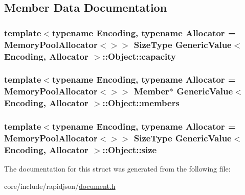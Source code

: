 \subsection{Member Data Documentation}
\subsubsection[{\texorpdfstring{capacity}{capacity}}]{\setlength{\rightskip}{0pt plus 5cm}template$<$typename Encoding, typename Allocator = Memory\+Pool\+Allocator$<$$>$$>$ {\bf Size\+Type} {\bf Generic\+Value}$<$ Encoding, Allocator $>$\+::Object\+::capacity}\hypertarget{structGenericValue_1_1Object_ab22a81c7ac57baf0d4ea343dfd6d8b33}{}\label{structGenericValue_1_1Object_ab22a81c7ac57baf0d4ea343dfd6d8b33}
\subsubsection[{\texorpdfstring{members}{members}}]{\setlength{\rightskip}{0pt plus 5cm}template$<$typename Encoding, typename Allocator = Memory\+Pool\+Allocator$<$$>$$>$ {\bf Member}$\ast$ {\bf Generic\+Value}$<$ Encoding, Allocator $>$\+::Object\+::members}\hypertarget{structGenericValue_1_1Object_ab51b8366577cb12f0280e4a6d7dab926}{}\label{structGenericValue_1_1Object_ab51b8366577cb12f0280e4a6d7dab926}
\subsubsection[{\texorpdfstring{size}{size}}]{\setlength{\rightskip}{0pt plus 5cm}template$<$typename Encoding, typename Allocator = Memory\+Pool\+Allocator$<$$>$$>$ {\bf Size\+Type} {\bf Generic\+Value}$<$ Encoding, Allocator $>$\+::Object\+::size}\hypertarget{structGenericValue_1_1Object_a10da3d9035961100ed11f955a4afd2b6}{}\label{structGenericValue_1_1Object_a10da3d9035961100ed11f955a4afd2b6}


The documentation for this struct was generated from the following file\+:\begin{DoxyCompactItemize}
\item 
core/include/rapidjson/\hyperlink{document_8h}{document.\+h}\end{DoxyCompactItemize}
